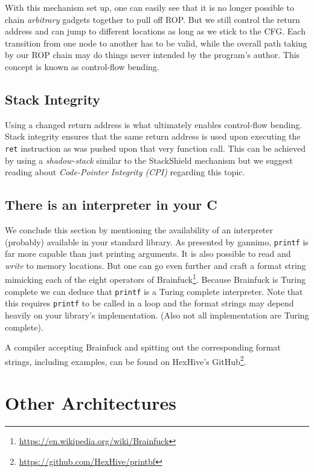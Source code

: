 \documentclass[article]{uibk}
\begin{document}
With this mechanism set up, one can easily see that it is no longer possible to
chain \emph{arbitrary} gadgets together to pull off ROP. But we still control
the return address and can jump to different locations as long as we stick to
the CFG. Each transition from one node to another has to be valid, while the
overall path taking by our ROP chain may do things never intended by the
program's author. This concept is known as control-flow bending.~
\cite{cf_bending}

\subsection{Stack Integrity}

Using a changed return address is what ultimately enables control-flow bending.
Stack integrity ensures that the same return address is used upon executing the
\texttt{ret} instruction as was pushed upon that very function call. This can
be achieved by using a \textit{shadow-stack} similar to the StackShield
mechanism but we suggest reading about \textit{Code-Pointer Integrity (CPI)}
\cite{cpi} regarding this topic.

\subsection{There is an interpreter in your C}
\label{sub:printbf}

We conclude this section by mentioning the availability of an interpreter
(probably) available in your standard library. As presented by gannimo,
\texttt{printf} is far more capable than just printing arguments. It is also
possible to read and \emph{write} to memory locations. But one can go even
further and craft a format string mimicking each of the eight operators of
Brainfuck\footnote{\url{https://en.wikipedia.org/wiki/Brainfuck}}. Because
Brainfuck is Turing complete we can deduce that \texttt{printf} is a Turing
complete interpreter. Note that this requires \texttt{printf} to be called in a
loop and the format strings may depend heavily on your library's
implementation. (Also not all implementation are Turing complete).

A compiler accepting Brainfuck and spitting out the corresponding format
strings, including examples, can be found on HexHive's
GitHub\footnote{\url{https://github.com/HexHive/printbf}}.

\section{Other Architectures}
\end{document}
